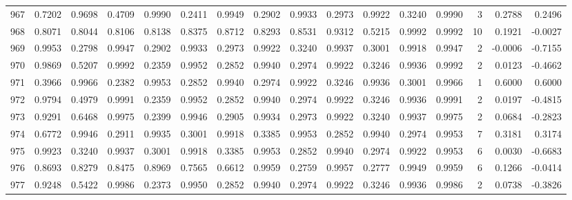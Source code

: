 \begin{tabular}{lrrrrrrrrrrrrrrr}
967 &      0.7202 &  0.9698 &  0.4709 &  0.9990 &  0.2411 &  0.9949 &  0.2902 &  0.9933 &  0.2973 &  0.9922 &   0.3240 &     0.9990 &      3 &                    0.2788 &                     0.2496 \\
968 &      0.8071 &  0.8044 &  0.8106 &  0.8138 &  0.8375 &  0.8712 &  0.8293 &  0.8531 &  0.9312 &  0.5215 &   0.9992 &     0.9992 &     10 &                    0.1921 &                    -0.0027 \\
969 &      0.9953 &  0.2798 &  0.9947 &  0.2902 &  0.9933 &  0.2973 &  0.9922 &  0.3240 &  0.9937 &  0.3001 &   0.9918 &     0.9947 &      2 &                   -0.0006 &                    -0.7155 \\
970 &      0.9869 &  0.5207 &  0.9992 &  0.2359 &  0.9952 &  0.2852 &  0.9940 &  0.2974 &  0.9922 &  0.3246 &   0.9936 &     0.9992 &      2 &                    0.0123 &                    -0.4662 \\
971 &      0.3966 &  0.9966 &  0.2382 &  0.9953 &  0.2852 &  0.9940 &  0.2974 &  0.9922 &  0.3246 &  0.9936 &   0.3001 &     0.9966 &      1 &                    0.6000 &                     0.6000 \\
972 &      0.9794 &  0.4979 &  0.9991 &  0.2359 &  0.9952 &  0.2852 &  0.9940 &  0.2974 &  0.9922 &  0.3246 &   0.9936 &     0.9991 &      2 &                    0.0197 &                    -0.4815 \\
973 &      0.9291 &  0.6468 &  0.9975 &  0.2399 &  0.9946 &  0.2905 &  0.9934 &  0.2973 &  0.9922 &  0.3240 &   0.9937 &     0.9975 &      2 &                    0.0684 &                    -0.2823 \\
974 &      0.6772 &  0.9946 &  0.2911 &  0.9935 &  0.3001 &  0.9918 &  0.3385 &  0.9953 &  0.2852 &  0.9940 &   0.2974 &     0.9953 &      7 &                    0.3181 &                     0.3174 \\
975 &      0.9923 &  0.3240 &  0.9937 &  0.3001 &  0.9918 &  0.3385 &  0.9953 &  0.2852 &  0.9940 &  0.2974 &   0.9922 &     0.9953 &      6 &                    0.0030 &                    -0.6683 \\
976 &      0.8693 &  0.8279 &  0.8475 &  0.8969 &  0.7565 &  0.6612 &  0.9959 &  0.2759 &  0.9957 &  0.2777 &   0.9949 &     0.9959 &      6 &                    0.1266 &                    -0.0414 \\
977 &      0.9248 &  0.5422 &  0.9986 &  0.2373 &  0.9950 &  0.2852 &  0.9940 &  0.2974 &  0.9922 &  0.3246 &   0.9936 &     0.9986 &      2 &                    0.0738 &                    -0.3826 \\

\end{tabular}
